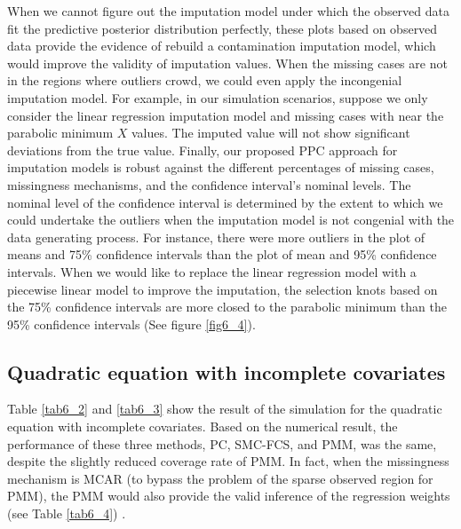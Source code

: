 	When we cannot figure out the imputation model under which the observed data fit the predictive posterior distribution perfectly, these plots based on observed data provide the evidence of rebuild a contamination imputation model, which would improve the validity of imputation values. When the missing cases are not in the regions where outliers crowd, we could even apply the incongenial imputation model. For example, in our simulation scenarios, suppose we only consider the linear regression imputation model and missing cases with near the parabolic minimum $X$ values. The imputed value will not show significant deviations from the true value. Finally, our proposed PPC approach for imputation models is robust against the different percentages of missing cases, missingness mechanisms, and the confidence interval's nominal levels. The nominal level of the confidence interval is determined by the extent to which we could undertake the outliers when the imputation model is not congenial with the data generating process. For instance, there were more outliers in the plot of means and 75\% confidence intervals than the plot of mean and 95\% confidence intervals. When we would like to replace the linear regression model with a piecewise linear model to improve the imputation, the selection knots based on the 75\% confidence intervals are more closed to the parabolic minimum than the 95\% confidence intervals (See figure \ref{fig6_4}). 
	
	\subsection{Quadratic equation with incomplete covariates}	
	Table \ref{tab6_2} and \ref{tab6_3} show the result of the simulation for the quadratic equation with incomplete covariates. Based on the numerical result, the performance of these three methods, PC, SMC-FCS, and PMM, was the same, despite the slightly reduced coverage rate of PMM. In fact, when the missingness mechanism is MCAR (to bypass the problem of the sparse observed region for PMM), the PMM would also provide the valid inference of the regression weights (see Table \ref{tab6_4}) \citep{Vink2013}.
	

